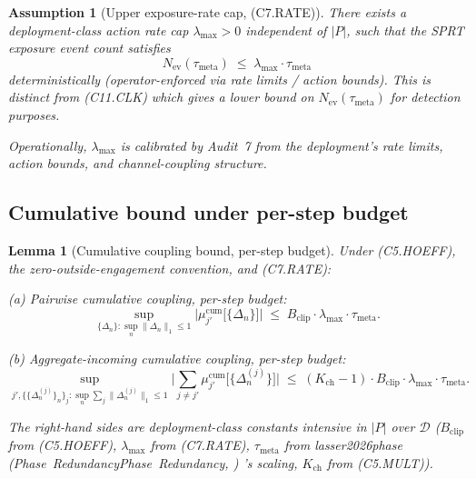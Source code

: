 \documentclass{article}
\makeatletter
\newcommand{\citep}[2][]{%
  \begingroup
  \def\@tmpkey{#2}%
  \ifx\@tmpkey\@empty\else
    (\ifx\@empty#1\@empty\else #1, \fi
     \@nameuse{bibkey@\@tmpkey})%
  \fi
  \endgroup
}
\newtheorem{lemma}{Lemma}
\newtheorem{assumption}{Assumption}
\newcommand{\Bclip}{B_{\mathrm{clip}}}
\newcommand{\Kch}{K_{\mathrm{ch}}}
\newcommand{\Nev}{N_{\mathrm{ev}}}
\newcommand{\lammax}{\lambda_{\max}}
\newcommand{\taumeta}{\tau_{\mathrm{meta}}}
\makeatother
\begin{document}
\begin{assumption}[Upper exposure-rate cap, (C7.RATE)]
\label{ass:c7-rate}
There exists a deployment-class action rate cap $\lammax > 0$
independent of $|P|$, such that the SPRT exposure event count
satisfies
\begin{equation}
\label{eq:c7-rate}
  \Nev(\taumeta) \;\leq\; \lammax \cdot \taumeta
\end{equation}
deterministically (operator-enforced via rate limits / action
bounds).  This is distinct from (C11.CLK) which gives a lower
bound on $\Nev(\taumeta)$ for detection purposes.

Operationally, $\lammax$ is calibrated by Audit~7 from the
deployment's rate limits, action bounds, and channel-coupling
structure.
\end{assumption}

\subsection{Cumulative bound under per-step budget}

\begin{lemma}[Cumulative coupling bound, per-step budget]
\label{lem:cumulative-v3}
Under (C5.HOEFF), the zero-outside-engagement convention, and
(C7.RATE):

(a) \emph{Pairwise} cumulative coupling, per-step budget:
\begin{equation}
\label{eq:pairwise-cum-v3}
  \sup_{\{\Delta_n\}: \sup_n \|\Delta_n\|_1 \leq 1}
  \big| \mu_{j'}^{\mathrm{cum}}\big[\{\Delta_n\}\big] \big|
  \;\leq\; \Bclip \cdot \lammax \cdot \taumeta.
\end{equation}

(b) \emph{Aggregate-incoming} cumulative coupling, per-step
budget:
\begin{equation}
\label{eq:aggregate-cum-v3}
  \sup_{j', \{\{\Delta_n^{(j)}\}_n\}_j : \sup_n \sum_j
  \|\Delta_n^{(j)}\|_1 \leq 1}
  \big| \sum_{j \neq j'}
    \mu_{j'}^{\mathrm{cum}}\big[\{\Delta_n^{(j)}\}\big] \big|
  \;\leq\; (\Kch - 1) \cdot \Bclip \cdot \lammax \cdot \taumeta.
\end{equation}

The right-hand sides are deployment-class constants intensive in
$|P|$ over $\mathcal{D}$ ($\Bclip$ from (C5.HOEFF), $\lammax$ from
(C7.RATE), $\taumeta$ from \citep[Phase~Redundancy]{lasser2026phase}'s
scaling, $\Kch$ from (C5.MULT)).
\end{lemma}
\end{document}
